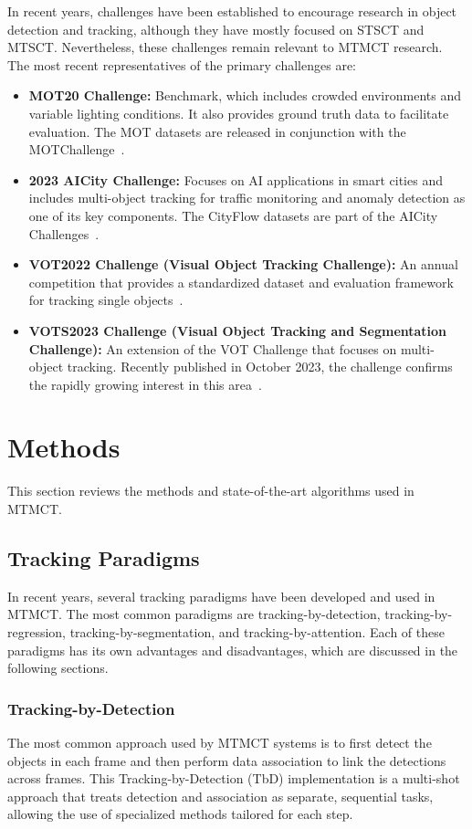 In recent years, challenges have been established to encourage research in object detection and tracking, although they have mostly focused on STSCT and MTSCT. Nevertheless, these challenges remain relevant to MTMCT research. The most recent representatives of the primary challenges are:

\begin{itemize}
    \item \textbf{MOT20 Challenge:} Benchmark, which includes crowded environments and variable lighting conditions. It also provides ground truth data to facilitate evaluation. The MOT datasets are released in conjunction with the MOTChallenge~\cite{Dendorfer20}.
    \item \textbf{2023 AICity Challenge:} Focuses on AI applications in smart cities and includes multi-object tracking for traffic monitoring and anomaly detection as one of its key components. The CityFlow datasets are part of the AICity Challenges~\cite{Naphade23}.
    \item \textbf{VOT2022 Challenge (Visual Object Tracking Challenge):} An annual competition that provides a standardized dataset and evaluation framework for tracking single objects~\cite{Kristan22}.
    \item \textbf{VOTS2023 Challenge (Visual Object Tracking and Segmentation Challenge):} An extension of the VOT Challenge that focuses on multi-object tracking. Recently published in October 2023, the challenge confirms the rapidly growing interest in this area~\cite{Kristan23}.
\end{itemize}

\section{Methods}\label{sec:methods}
This section reviews the methods and state-of-the-art algorithms used in MTMCT.

\subsection{Tracking Paradigms}\label{subsec:tracking_paradigms}
In recent years, several tracking paradigms have been developed and used in MTMCT. The most common paradigms are tracking-by-detection, tracking-by-regression, tracking-by-segmentation, and tracking-by-attention. Each of these paradigms has its own advantages and disadvantages, which are discussed in the following sections.

\subsubsection{Tracking-by-Detection}\label{subsubsec:tracking-by-detection}
The most common approach used by MTMCT systems is to first detect the objects in each frame and then perform data association to link the detections across frames. This Tracking-by-Detection (TbD) implementation is a multi-shot approach that treats detection and association as separate, sequential tasks, allowing the use of specialized methods tailored for each step.

